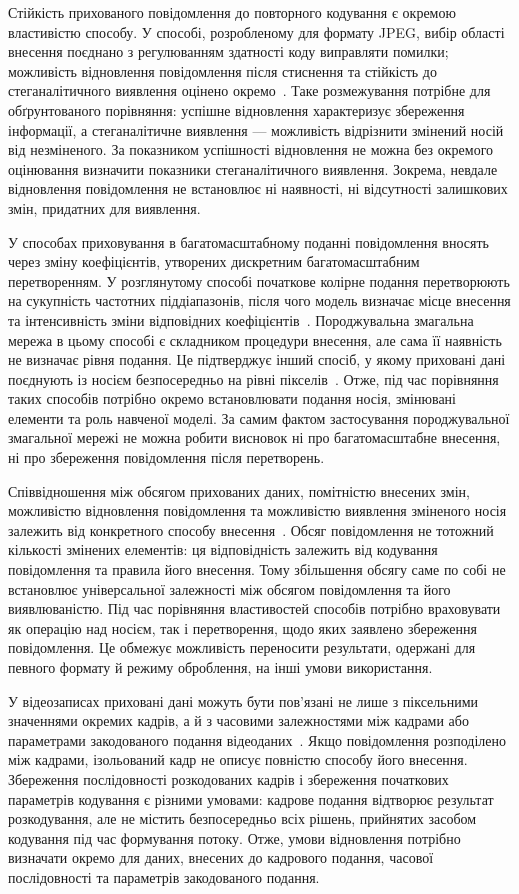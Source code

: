 Стійкість прихованого повідомлення до повторного кодування є окремою властивістю способу. У способі, розробленому для формату JPEG, вибір області внесення поєднано з регулюванням здатності коду виправляти помилки; можливість відновлення повідомлення після стиснення та стійкість до стеганалітичного виявлення оцінено окремо~\cite{duan2023jpeg}. Таке розмежування потрібне для обґрунтованого порівняння: успішне відновлення характеризує збереження інформації, а стеганалітичне виявлення --- можливість відрізнити змінений носій від незміненого. За показником успішності відновлення не можна без окремого оцінювання визначити показники стеганалітичного виявлення. Зокрема, невдале відновлення повідомлення не встановлює ні наявності, ні відсутності залишкових змін, придатних для виявлення.

У способах приховування в багатомасштабному поданні повідомлення вносять через зміну коефіцієнтів, утворених дискретним багатомасштабним перетворенням. У розглянутому способі початкове колірне подання перетворюють на сукупність частотних піддіапазонів, після чого модель визначає місце внесення та інтенсивність зміни відповідних коефіцієнтів~\cite{yao2024ganwavelet}. Породжувальна змагальна мережа в цьому способі є складником процедури внесення, але сама її наявність не визначає рівня подання. Це підтверджує інший спосіб, у якому приховані дані поєднують із носієм безпосередньо на рівні пікселів~\cite{yuan2022gansecurity}. Отже, під час порівняння таких способів потрібно окремо встановлювати подання носія, змінювані елементи та роль навченої моделі. За самим фактом застосування породжувальної змагальної мережі не можна робити висновок ні про багатомасштабне внесення, ні про збереження повідомлення після перетворень.

Співвідношення між обсягом прихованих даних, помітністю внесених змін, можливістю відновлення повідомлення та можливістю виявлення зміненого носія залежить від конкретного способу внесення~\cite{apau2024review}. Обсяг повідомлення не тотожний кількості змінених елементів: ця відповідність залежить від кодування повідомлення та правила його внесення. Тому збільшення обсягу саме по собі не встановлює універсальної залежності між обсягом повідомлення та його виявлюваністю. Під час порівняння властивостей способів потрібно враховувати як операцію над носієм, так і перетворення, щодо яких заявлено збереження повідомлення. Це обмежує можливість переносити результати, одержані для певного формату й режиму оброблення, на інші умови використання.

У відеозаписах приховані дані можуть бути пов’язані не лише з піксельними значеннями окремих кадрів, а й з часовими залежностями між кадрами або параметрами закодованого подання відеоданих~\cite{bouzegza2022video}. Якщо повідомлення розподілено між кадрами, ізольований кадр не описує повністю способу його внесення. Збереження послідовності розкодованих кадрів і збереження початкових параметрів кодування є різними умовами: кадрове подання відтворює результат розкодування, але не містить безпосередньо всіх рішень, прийнятих засобом кодування під час формування потоку. Отже, умови відновлення потрібно визначати окремо для даних, внесених до кадрового подання, часової послідовності та параметрів закодованого подання.

